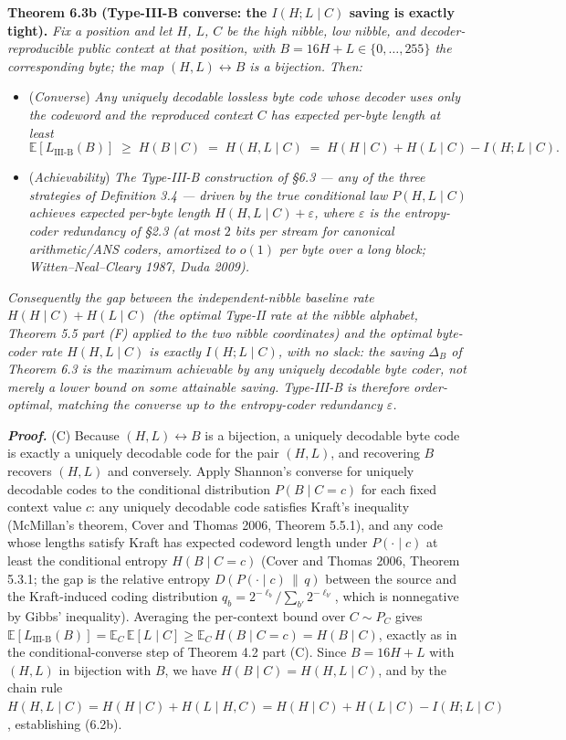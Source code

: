 \documentclass[
]{article}
\begin{document}
\textbf{Theorem 6.3b (Type-III-B converse: the $I(H;L \mid C)$
saving is exactly tight).} \emph{Fix a position and let $H$, $L$, $C$
be the high nibble, low nibble, and decoder-reproducible public
context at that position, with $B = 16H + L \in \{0, \ldots, 255\}$
the corresponding byte; the map $(H, L) \leftrightarrow B$ is a
bijection. Then:}
\begin{itemize}
\item[\textbf{(C)}] (\emph{Converse}) \emph{Any uniquely decodable
lossless byte code whose decoder uses only the codeword and the
reproduced context $C$ has expected per-byte length at least}
\[
\mathbb{E}[L_{\mathrm{III\text{-}B}}(B)] \;\geq\; H(B \mid C) \;=\; H(H, L \mid C)
\;=\; H(H \mid C) + H(L \mid C) - I(H ; L \mid C).
\tag{6.2b}
\]
\item[\textbf{(A)}] (\emph{Achievability}) \emph{The Type-III-B
construction of §6.3 --- any of the three strategies of
Definition 3.4 --- driven by the true conditional law
$P(H, L \mid C)$ achieves expected per-byte length
$H(H, L \mid C) + \varepsilon$, where $\varepsilon$ is the
entropy-coder redundancy of §2.3 (at most $2$ bits per stream for
canonical arithmetic/ANS coders, amortized to $o(1)$ per byte over a
long block; Witten--Neal--Cleary 1987, Duda 2009).}
\end{itemize}
\emph{Consequently the gap between the independent-nibble baseline
rate $H(H \mid C) + H(L \mid C)$ (the optimal Type-II rate at the
nibble alphabet, Theorem 5.5 part (F) applied to the two nibble
coordinates) and the optimal byte-coder rate $H(H, L \mid C)$ is
exactly $I(H ; L \mid C)$, with no slack: the saving $\Delta_B$ of
Theorem 6.3 is the \emph{maximum} achievable by any uniquely
decodable byte coder, not merely a lower bound on some attainable
saving. Type-III-B is therefore order-optimal, matching the converse
up to the entropy-coder redundancy $\varepsilon$.}

\emph{\textbf{Proof.}} (C) Because $(H, L) \leftrightarrow B$ is a
bijection, a uniquely decodable byte code is exactly a uniquely
decodable code for the pair $(H, L)$, and recovering $B$ recovers
$(H, L)$ and conversely. Apply Shannon's converse for uniquely
decodable codes to the conditional distribution $P(B \mid C = c)$ for
each fixed context value $c$: any uniquely decodable code satisfies
Kraft's inequality (McMillan's theorem, Cover and Thomas 2006,
Theorem 5.5.1), and any code whose lengths satisfy Kraft has expected
codeword length under $P(\cdot \mid c)$ at least the conditional
entropy $H(B \mid C = c)$ (Cover and Thomas 2006, Theorem 5.3.1; the
gap is the relative entropy $D(P(\cdot \mid c) \,\|\, q)$ between the
source and the Kraft-induced coding distribution
$q_b = 2^{-\ell_b} / \sum_{b'} 2^{-\ell_{b'}}$, which is nonnegative
by Gibbs' inequality). Averaging the per-context bound
over $C \sim P_C$ gives
$\mathbb{E}[L_{\mathrm{III\text{-}B}}(B)] = \mathbb{E}_C
\,\mathbb{E}[L \mid C] \geq \mathbb{E}_C\, H(B \mid C = c) = H(B \mid C)$,
exactly as in the conditional-converse step of Theorem 4.2 part (C).
Since $B = 16H + L$ with $(H, L)$ in bijection with $B$, we have
$H(B \mid C) = H(H, L \mid C)$, and by the chain rule
$H(H, L \mid C) = H(H \mid C) + H(L \mid H, C)
= H(H \mid C) + H(L \mid C) - I(H ; L \mid C)$, establishing (6.2b).
\end{document}
